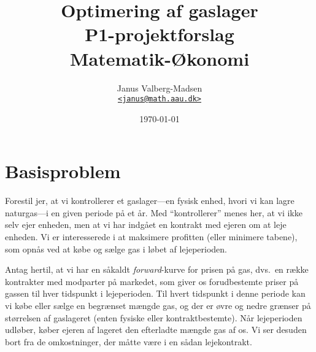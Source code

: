 \documentclass[12pt,oneside,final]{article}
\title{%
  Optimering af gaslager\\
  \large P1-projektforslag \\
  Matematik-{\O}konomi
}
\author{
  Janus Valberg-Madsen\\
  \href{mailto:janus@math.aau.dk}{\texttt{<janus@math.aau.dk>}}
}
\date{\today}
\newcommand{\1}{\mathbbm{1}}
\begin{document}
\maketitle

\begin{center}
\end{center}

\tableofcontents

\clearpage
\section{Basisproblem}

Forestil jer, at vi kontrollerer et gaslager---en fysisk enhed, hvori vi kan lagre naturgas---i en given periode på et år.
Med ``kontrollerer'' menes her, at vi ikke selv ejer enheden, men at vi har indgået en kontrakt med ejeren om at leje enheden.
Vi er interesserede i at maksimere profitten (eller minimere tabene), som opnås ved at købe og sælge gas i løbet af lejeperioden.

Antag hertil, at vi har en såkaldt \emph{forward}-kurve for prisen på gas, dvs.\ en række kontrakter med modparter på markedet, som giver os forudbestemte priser på gassen til hver tidspunkt i lejeperioden.
Til hvert tidspunkt i denne periode kan vi købe eller sælge en begrænset mængde gas, og der er øvre og nedre grænser på størrelsen af gaslageret (enten fysiske eller kontraktbestemte).
Når lejeperioden udløber, køber ejeren af lageret den efterladte mængde gas af os.
Vi ser desuden bort fra de omkostninger, der måtte være i en sådan lejekontrakt.
\end{document}
